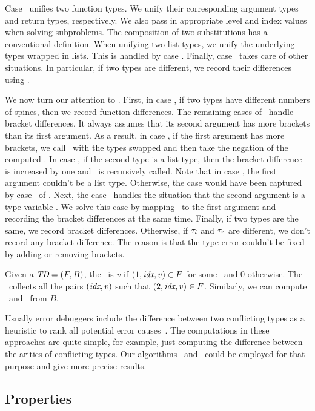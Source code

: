 \documentclass[12pt]{report}	%
\begin{document}
Case \namevc\ unifies two function types. We unify their corresponding
argument types and return types, respectively. We also pass in appropriate
level and index values when solving subproblems. The composition of two
substitutions has a conventional definition. When unifying two list types,
we unify the underlying types wrapped in lists. This is handled by case \namevd. Finally,
case \nameve\ takes care of other situations. In particular, if two types are different,
we record their differences using \dalg.

We now turn our attention to \dalg. First, in case \namevf, if two types have
different numbers of spines, then we record function differences.
%
The remaining cases of \dalg\ handle bracket differences. It
always assumes that its second argument has more brackets than its first
argument. As a result, in case \namevg, if the first argument has more
brackets, we call \dalg\ with the types swapped and then take the negation of
the computed \td. In case \namevh, if the second type is a list type, then
the bracket difference is increased by one and \dalg\ is recursively
called. Note that in case \namevh, the first argument couldn't be a list type.
Otherwise, the case would have been captured by case \namevd\ of \ualg.
Next, the case \namevi\ handles the situation that the second argument
is a type variable \tv. We solve this case by mapping \tv\ to the first
argument and recording the bracket differences at the same time. Finally,
if two types are the same, we record bracket differences. Otherwise, if
$\tau_l$ and $\tau_r$ are different, we don't record any bracket difference.
The reason is that the type error couldn't be fixed by adding or removing
brackets.

Given a $\textit{TD}=(F,B)$, the \TopLevelDiff\ is $v$ if $(1,\textit{idx},v) \in F$
for some \idx\ and 0 otherwise. The \FuncDiff\ collects all the pairs
$(\textit{idx},v)$ such that $(2,\textit{idx},v) \in F$. Similarly, we can
compute \TopBracketDiff\ and \BracketDiff\ from $B$.

Usually error debuggers include the difference between two
conflicting types as a heuristic to rank all potential error
causes~\cite{Chen14:CFT,Hage07:HTE}. The computations in these
approaches are quite simple, for example, just computing the
difference between the arities of conflicting types. Our
algorithms \ualg\ and \dalg\ could be employed for that purpose
and give more precise results.

\subsection{Properties}
\label{sec:unify:prop}
\end{document}
